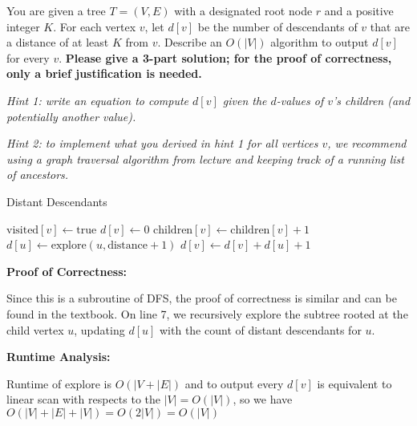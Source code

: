 \documentclass[11pt]{article}
\begin{document}
You are given a tree $T=(V, E)$ with a designated root node $r$ and a positive integer $K$. For each vertex $v$, let $d[v]$ be the number of descendants of $v$ that are a distance of at least $K$ from $v$. Describe an $O(|V|)$ algorithm to output $d[v]$ for every $v$. \textbf{Please give a 3-part solution; for the proof of correctness, only a brief justification is needed.}

\emph{Hint 1: write an equation to compute $d[v]$ given the $d$-values of $v$'s children (and potentially another value).}

\emph{Hint 2: to implement what you derived in hint 1 for all vertices $v$, we recommend using a graph traversal algorithm from lecture and keeping track of a running list of ancestors.}
\begin{solution}
    \begin{algorithm}
    \caption{\color{blue}Distant Descendants}
    \color{blue}
        \begin{algorithmic}[1]
        \State $\text{visited}[v] \gets \text{true}$
        \State $d[v] \gets 0$ 
                \State $\text{children}[v] \gets \text{children}[v] + 1$ 
                \State $d[u] \gets \text{explore}(u, \text{distance} + 1)$
                    \State $d[v] \gets d[v] + d[u] + 1$ 
                \EndIf
            \EndIf
        \EndFor
        \State {}
        \EndProcedure
        \end{algorithmic}
    \end{algorithm}
    \begin{center}
        \textbf{Proof of Correctness: }
    \end{center}
    Since this is a subroutine of DFS, the proof of correctness is similar and can be found in the textbook.
    On line 7, we recursively explore the subtree rooted at the child vertex $u$, updating $d[u]$ with the count of distant descendants for $u$.
    \begin{center}
        \textbf{Runtime Analysis: }
    \end{center}
    Runtime of explore is $O(|V + |E|)$ and to output every $d[v]$ is equivalent to linear scan with respects to the $|V| = O(|V|)$, so we have
    $O(|V| + |E| + |V|) = O(2|V|) = O(|V|)$
\end{solution}
\newpage
\end{document}
